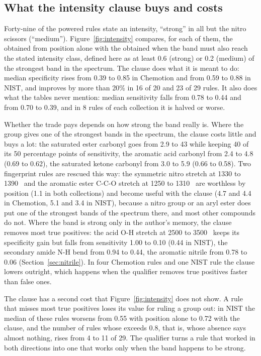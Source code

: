 

\subsection{What the intensity clause buys and costs}
\label{sec:intensity}

Forty-nine of the powered rules state an intensity, ``strong'' in all but the nitro scissors (``medium''). Figure~\ref{fig:intensity} compares, for each of them, the \LRp{} obtained from position alone with the \LRp{} obtained when the band must also reach the stated intensity class, defined here as at least 0.6 (strong) or 0.2 (medium) of the strongest band in the spectrum. The clause does what it is meant to do: median specificity rises from 0.39 to 0.85 in Chemotion and from 0.59 to 0.88 in NIST, and \LRp{} improves by more than 20\% in 16 of 20 and 23 of 29 rules. It also does what the tables never mention: median sensitivity falls from 0.78 to 0.44 and from 0.70 to 0.39, and in 8 rules of each collection it is halved or worse.

Whether the trade pays depends on how strong the band really is. Where the group gives one of the strongest bands in the spectrum, the clause costs little and buys a lot: the saturated ester carbonyl goes from 2.9 to 43 while keeping 40 of its 50 percentage points of sensitivity, the aromatic acid carbonyl from 2.4 to 4.8 (0.69 to 0.62), the saturated ketone carbonyl from 3.0 to 5.9 (0.66 to 0.58). Two fingerprint rules are rescued this way: the symmetric nitro stretch at 1330 to 1390~\wn{} and the aromatic ester C-C-O stretch at 1250 to 1310~\wn{} are worthless by position (1.1 in both collections) and become useful with the clause (4.7 and 4.4 in Chemotion, 5.1 and 3.4 in NIST), because a nitro group or an aryl ester does put one of the strongest bands of the spectrum there, and most other compounds do not. Where the band is strong only in the author's memory, the clause removes most true positives: the acid O-H stretch at 2500 to 3500~\wn{} keeps its specificity gain but falls from sensitivity 1.00 to 0.10 (0.44 in NIST), the secondary amide N-H bend from 0.94 to 0.44, the aromatic nitrile from 0.78 to 0.06 (Section~\ref{sec:nitrile}). In four Chemotion rules and one NIST rule the clause lowers \LRp{} outright, which happens when the qualifier removes true positives faster than false ones.

The clause has a second cost that Figure~\ref{fig:intensity} does not show. A rule that misses most true positives loses its value for ruling a group out: in NIST the median \LRn{} of these rules worsens from 0.55 with position alone to 0.72 with the clause, and the number of rules whose \LRn{} exceeds 0.8, that is, whose absence says almost nothing, rises from 4 to 11 of 29. The qualifier turns a rule that worked in both directions into one that works only when the band happens to be strong.

